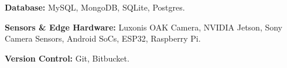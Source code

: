         \begin{onecolentry}
            \textbf{Database:} MySQL, MongoDB, SQLite, Postgres.
        \end{onecolentry}
        \vspace{0.05 cm}

        \begin{onecolentry}
            \textbf{Sensors \& Edge Hardware:} Luxonis OAK Camera, NVIDIA Jetson, Sony Camera Sensors, Android SoCs, ESP32, Raspberry Pi.
        \end{onecolentry}
        \vspace{0.05 cm}

        \begin{onecolentry}
            \textbf{Version Control:} Git, Bitbucket.
        \end{onecolentry}

